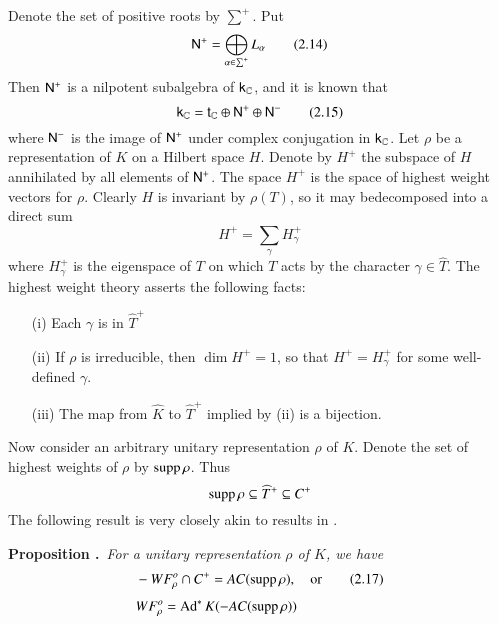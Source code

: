 Denote the set of positive roots by $\sum^{+}$. Put
\begin{equation*}
\mathsf{N}^{+}=\bigoplus\limits_{\alpha\in \sum^{+}}L_{\alpha}\tag{2.14}\label{art3-eq2.14}
\end{equation*}
Then $\mathsf{N}^{+}$ is a nilpotent subalgebra of $\mathsf{k}_{\mathbb{C}}$, and it is known that
\begin{equation*}
\mathsf{k}_{\mathbb{C}}=\mathsf{t}_{\mathbb{C}}\oplus \mathsf{N}^{+}\oplus \mathsf{N}^{-}\tag{2.15}\label{art3-eq2.15}
\end{equation*}
where $\mathsf{N}^{-}$ is the image of $\mathsf{N}^{+}$ under complex conjugation in $\mathsf{k}_{\mathbb{C}}$. Let $\rho$ be a representation of $K$ on a Hilbert space $H$. Denote by $H^{+}$ the subspace of $H$ annihilated by all elements of $\mathsf{N}^{+}$. The space $H^{+}$ is the space of highest weight vectors for $\rho$. Clearly $H$ is invariant by $\rho(T)$, so it may be\pageoriginale decomposed into a direct sum
\begin{equation*}
H^{+}=\sum\limits_{\gamma}H^{+}_{\gamma}\tag{2.16}\label{art3-eq2.16}
\end{equation*}
where $H^{+}_{\gamma}$ is the eigenspace of $T$ on which $T$ acts by the character $\gamma\in \widehat{T}$. The highest weight theory asserts the following facts:
\begin{itemize}
\item[(i)] Each $\gamma$ is in $\widehat{T}^{+}$

\item[(ii)] If $\rho$ is irreducible, then $\dim H^{+}=1$, so that $H^{+}=H^{+}_{\gamma}$ for some well-defined $\gamma$.

\item[(iii)] The map from $\widehat{K}$ to $\widehat{T}^{+}$ implied by (ii) is a bijection.
\end{itemize}

Now consider an arbitrary unitary representation $\rho$ of $K$. Denote the set of highest weights of $\rho$ by $\operatorname{supp} \rho$. Thus
$$
\operatorname{supp} \rho\subseteq \widehat{T}^{+}\subseteq C^{+}
$$
The following result is very closely akin to results in \cite{art3-KV}.

\medskip
\noindent
{\bf Proposition .\label{art3-prop2.3}}~{\em For a unitary representation $\rho$ of $K$, we have}
\begin{align*}
& -WF^{o}_{\rho}\cap C^{+}=AC(\operatorname{supp} \rho),\quad\text{or}\tag{2.17}\label{art3-eq2.17}\\[3pt]
& WF^{o}_{\rho}=\operatorname{Ad}^{*}K(-AC(\operatorname{supp} \rho))
\end{align*}


